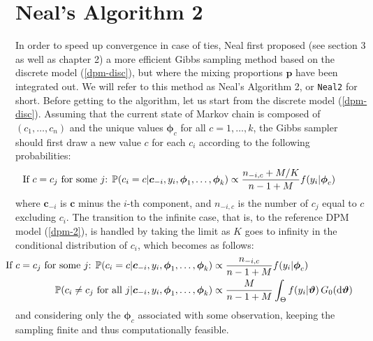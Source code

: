 \section{Neal's Algorithm 2} \label{neal2}
In order to speed up convergence in case of ties, Neal first proposed (see \cite{neal} section 3 as well as \cite{book} chapter 2) a more efficient Gibbs sampling method based on the discrete model (\ref{dpm-disc}), but where the mixing proportions $\textbf{p}$ have been integrated out.
We will refer to this method as Neal's Algorithm 2, or \verb|Neal2| for short.
Before getting to the algorithm, let us start from the discrete model (\ref{dpm-disc}).
Assuming that the current state of Markov chain is composed of $(c_1,\dots,c_n)$  and the unique values $\boldsymbol\phi_c$ for all $c=1,\dots,k$, the Gibbs sampler should first draw a new value $c$ for each $c_i$ according to the following probabilities:
\begin{align}
	\hspace{-25pt}
	\vspace{-12pt}
	\text{If $c=c_j$ for some $j$: }
	\PP(c_{i}=c | \boldsymbol c_{-i}, y_{i},\boldsymbol{\phi}_1,\dots,\boldsymbol{\phi}_k) \propto \frac{n_{-i,c} + M/{K}}{n-1+M} f(y_{i}|\boldsymbol\phi_{c}) 
\end{align}
where $\boldsymbol c_{-i}$ is $\boldsymbol c$ minus the $i$-th component, and $n_{-i,c}$ is the number of $c_j$ equal to $c$ excluding $c_i$.
The transition to the infinite case, that is, to the reference DPM model (\ref{dpm-2}), is handled by taking the limit as $K$ goes to infinity in the conditional distribution of $c_i$, which becomes as follows:
\begin{equation}
	\begin{aligned} \label{probasneal2}
	\hspace{-25pt}
	\vspace{-12pt}
	\text{If $c=c_j$ for some $j$: }
	\PP(c_{i}=c | \boldsymbol c_{-i}, y_{i}, \boldsymbol{\phi}_1,\dots,\boldsymbol{\phi}_k) &\propto \frac{n_{-i,c} }{n-1+M} f(y_{i}|\boldsymbol\phi_{c}) \\
	\PP(c_{i}\neq c_{j} \text{ for all } j | \boldsymbol c_{-i}, y_{i}, \boldsymbol{\phi}_1,\dots,\boldsymbol{\phi}_k) &\propto \frac{M }{n-1+M} \int_{\Theta} f(y_{i}|\boldsymbol\theta) \, G_0(\de\boldsymbol\theta)
	\end{aligned}
\end{equation}
and considering only the $\boldsymbol\phi_c$ associated with some observation, keeping the sampling finite and thus computationally feasible.
